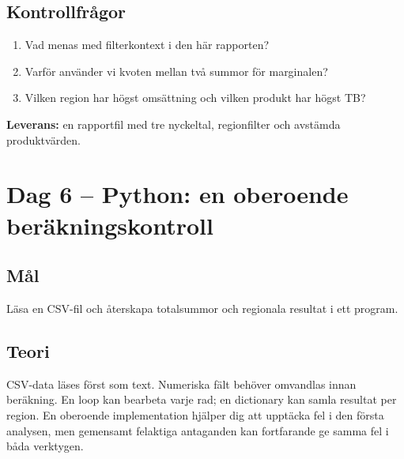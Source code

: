 \documentclass[11pt,a4paper]{article}
\newcommand{\dag}[2]{\clearpage\section{Dag #1 -- #2}}
\begin{document}
\subsection*{Kontrollfrågor}
\begin{enumerate}
\item Vad menas med filterkontext i den här rapporten?
\item Varför använder vi kvoten mellan två summor för marginalen?
\item Vilken region har högst omsättning och vilken produkt har högst TB?
\end{enumerate}
\textbf{Leverans:} en rapportfil med tre nyckeltal, regionfilter och avstämda produktvärden.

\dag{6}{Python: en oberoende beräkningskontroll}
\subsection*{Mål}
Läsa en CSV-fil och återskapa totalsummor och regionala resultat i ett program.
\subsection*{Teori}
CSV-data läses först som text. Numeriska fält behöver omvandlas innan beräkning. En loop kan bearbeta varje rad; en dictionary kan samla resultat per region. En oberoende implementation hjälper dig att upptäcka fel i den första analysen, men gemensamt felaktiga antaganden kan fortfarande ge samma fel i båda verktygen.
\end{document}
